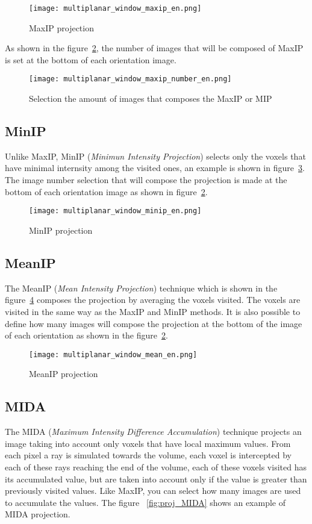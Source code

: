 \begin{figure}[H]
\centering
\texttt{[image: multiplanar\_window\_maxip\_en.png]}
\caption{MaxIP projection}
\label{fig:proj_maxip}
\end{figure}

As shown in the figure~\ref{fig:proj_maxip_qtd}, the number of images that will be composed of MaxIP is set at the bottom of each orientation image.

\begin{figure}[H]
\centering
\texttt{[image: multiplanar\_window\_maxip\_number\_en.png]}
\caption{Selection the amount of images that composes the MaxIP or MIP}
\label{fig:proj_maxip_qtd}
\end{figure}

\subsection{MinIP}

Unlike MaxIP, MinIP (\textit{Minimun Intensity Projection}) selects only the voxels that have minimal internsity among the visited ones, an example is shown in figure~\ref{fig:proj_minIP}. The image number selection that will compose the projection is made at the bottom of each orientation image as shown in figure~\ref{fig:proj_maxip_qtd}.

\begin{figure}[H]
\centering
\texttt{[image: multiplanar\_window\_minip\_en.png]}
\caption{MinIP projection}
\label{fig:proj_minIP}
\end{figure}

\subsection{MeanIP}
The MeanIP (\textit{Mean Intensity Projection}) technique which is shown in the figure~\ref{fig:proj_meanIP} composes the projection by averaging the voxels visited. The voxels are visited in the same way as the MaxIP and MinIP methods. It is also possible to define how many images will compose the projection at the bottom of the image of each orientation as shown in the figure~\ref{fig:proj_maxip_qtd}.

\begin{figure}[H]
\centering
\texttt{[image: multiplanar\_window\_mean\_en.png]}
\caption{MeanIP projection}
\label{fig:proj_meanIP}
\end{figure}

\subsection{MIDA}
\label{sub:mida}
The MIDA (\textit{Maximum Intensity Difference Accumulation}) technique projects an image taking into account only voxels that have local maximum values. From each pixel a ray is simulated towards the volume, each voxel is intercepted by each of these rays reaching the end of the volume, each of these voxels visited has its accumulated value, but are taken into account only if the value is greater than previously visited values. Like MaxIP, you can select how many images are used to accumulate the values. The figure ~\ref{fig:proj_MIDA} shows an example of MIDA projection.


